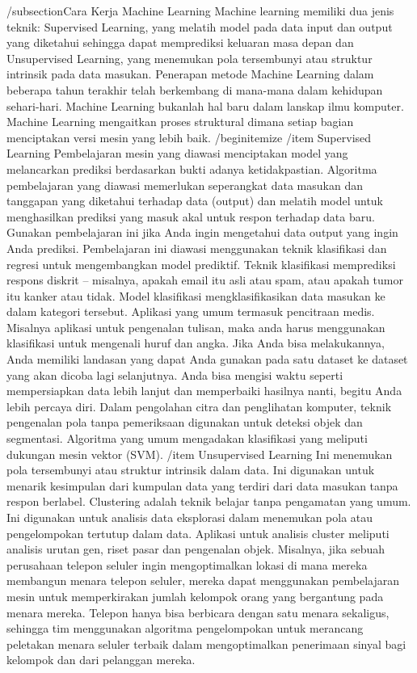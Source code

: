 /subsection{Cara Kerja Machine Learning}
Machine learning memiliki dua jenis teknik: Supervised Learning, yang melatih model pada data input dan output yang diketahui sehingga dapat memprediksi keluaran masa depan dan Unsupervised Learning, yang menemukan pola tersembunyi atau struktur intrinsik pada data masukan.
Penerapan metode Machine Learning dalam beberapa tahun terakhir telah berkembang di mana-mana dalam kehidupan sehari-hari. Machine Learning bukanlah hal baru dalam lanskap ilmu komputer. Machine Learning mengaitkan proses struktural dimana setiap bagian menciptakan versi mesin yang lebih baik.
/begin{itemize}
/item Supervised Learning
Pembelajaran mesin yang diawasi menciptakan model yang melancarkan prediksi berdasarkan bukti adanya ketidakpastian. Algoritma pembelajaran yang diawasi memerlukan seperangkat data masukan dan tanggapan yang diketahui terhadap data (output) dan melatih model untuk menghasilkan prediksi yang masuk akal untuk respon terhadap data baru. Gunakan pembelajaran ini jika Anda ingin mengetahui data output yang ingin Anda prediksi. Pembelajaran ini diawasi menggunakan teknik klasifikasi dan regresi untuk mengembangkan model prediktif.
Teknik klasifikasi memprediksi respons diskrit – misalnya, apakah email itu asli atau spam, atau apakah tumor itu kanker atau tidak. Model klasifikasi mengklasifikasikan data masukan ke dalam kategori tersebut. Aplikasi yang umum termasuk pencitraan medis. Misalnya aplikasi untuk pengenalan tulisan, maka anda harus menggunakan klasifikasi untuk mengenali huruf dan angka.
Jika Anda bisa melakukannya, Anda memiliki landasan yang dapat Anda gunakan pada satu dataset ke dataset yang akan dicoba lagi selanjutnya. Anda bisa mengisi waktu seperti mempersiapkan data lebih lanjut dan memperbaiki hasilnya nanti, begitu Anda lebih percaya diri. Dalam pengolahan citra dan penglihatan komputer, teknik pengenalan pola tanpa pemeriksaan digunakan untuk deteksi objek dan segmentasi. Algoritma yang umum mengadakan klasifikasi yang meliputi dukungan mesin vektor (SVM).
/item Unsupervised Learning
Ini menemukan pola tersembunyi atau struktur intrinsik dalam data. Ini digunakan untuk menarik kesimpulan dari kumpulan data yang terdiri dari data masukan tanpa respon berlabel. Clustering adalah teknik belajar tanpa pengamatan yang umum. Ini digunakan untuk analisis data eksplorasi dalam menemukan pola atau pengelompokan tertutup dalam data. Aplikasi untuk analisis cluster meliputi analisis urutan gen, riset pasar dan pengenalan objek.
Misalnya, jika sebuah perusahaan telepon seluler ingin mengoptimalkan lokasi di mana mereka membangun menara telepon seluler, mereka dapat menggunakan pembelajaran mesin untuk memperkirakan jumlah kelompok orang yang bergantung pada menara mereka. Telepon hanya bisa berbicara dengan satu menara sekaligus, sehingga tim menggunakan algoritma pengelompokan untuk merancang peletakan menara seluler terbaik dalam mengoptimalkan penerimaan sinyal bagi kelompok dan dari pelanggan mereka.
